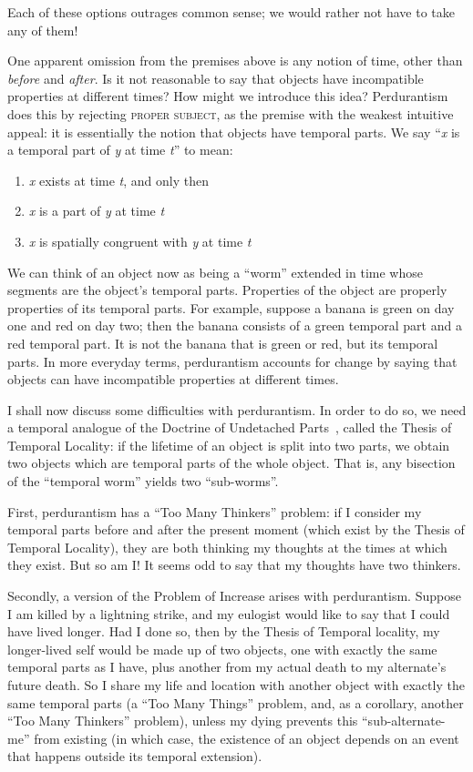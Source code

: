 \documentclass[english]{scrartcl}
\newcommand{\law}[1]{\textsc{#1}}
\newcommand{\var}[1]{\emph{#1}}
\begin{document}
\noindent Each of these options outrages common sense; we would rather not have to take any of them!

One apparent omission from the premises above is any notion of time, other than \emph{before} and \emph{after}. Is it not reasonable to say that objects have incompatible properties at different times? How might we introduce this idea? Perdurantism does this by rejecting \law{proper subject}, as the premise with the weakest intuitive appeal: it is essentially the notion that objects have temporal parts. We say “\var{x} is a temporal part of \var{y} at time \var{t}” to mean:

\begin{enumerate}
\item \var{x} exists at time \var{t}, and only then
\item \var{x} is a part of \var{y} at time \var{t}
\item \var{x} is spatially congruent with \var{y} at time \var{t}
\end{enumerate}

We can think of an object now as being a “worm” extended in time whose segments are the object’s temporal parts. Properties of the object are properly properties of its temporal parts. For example, suppose a banana is green on day one and red on day two; then the banana consists of a green temporal part and a red temporal part. It is not the banana that is green or red, but its temporal parts. In more everyday terms, perdurantism accounts for change by saying that objects can have incompatible properties at different times.

I shall now discuss some difficulties with perdurantism. In order to do so, we need a temporal analogue of the Doctrine of Undetached Parts~\cite{vanInwagen1981}, called the Thesis of Temporal Locality: if the lifetime of an object is split into two parts, we obtain two objects which are temporal parts of the whole object. That is, any bisection of the “temporal worm” yields two “sub-worms”.

First, perdurantism has a “Too Many Thinkers” problem: if I consider my temporal parts before and after the present moment (which exist by the Thesis of Temporal Locality), they are both thinking my thoughts at the times at which they exist. But so am I! It seems odd to say that my thoughts have two thinkers.

Secondly, a version of the Problem of Increase arises with perdurantism. Suppose I am killed by a lightning strike, and my eulogist would like to say that I could have lived longer. Had I done so, then by the Thesis of Temporal locality, my longer-lived self would be made up of two objects, one with exactly the same temporal parts as I have, plus another from my actual death to my alternate’s future death. So I share my life and location with another object with exactly the same temporal parts (a “Too Many Things” problem, and, as a corollary, another “Too Many Thinkers” problem), unless my dying prevents this “sub-alternate-me” from existing (in which case, the existence of an object depends on an event that happens outside its temporal extension).
\end{document}
